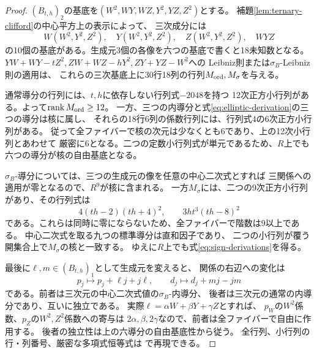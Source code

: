 \begin{proof}
$(B_{t,h})_2$の基底を$(W^2,WY,WZ,Y^2,YZ,Z^2)$とする。
補題\ref{lem:ternary-clifford}の中心平方上の表示によって、
三次成分には
\[
 W(W^2,Y^2,Z^2),\quad Y(W^2,Y^2,Z^2),\quad
 Z(W^2,Y^2,Z^2),\quad WYZ
\]
の10個の基底がある。生成元3個の各像を六つの基底で書くと18未知数となる。
$YW+WY-tZ^2,ZW+WZ-hY^2,ZY+YZ-W^2$への
Leibniz則または$\sigma_B$-Leibniz則の適用は、
これらの三次基底上に30行18列の行列$M_{\rm ord},M_\sigma$を与える。

通常導分の行列には、$t,h$に依存しない行列式$-2048$を持つ
12次正方小行列がある。よって$\operatorname{rank}M_{\rm ord}\ge12$。
一方、三つの内導分と式\eqref{eq:elliptic-derivation}の三つの導分は核に属し、
それらの18行6列の係数行列には、行列式$4$の6次正方小行列がある。
従って全ファイバーで核の次元は少なくとも6であり、上の12次小行列とあわせて
厳密に6となる。二つの定数小行列式が単元であるため、$R$上でも
六つの導分が核の自由基底となる。

$\sigma_B$-導分については、三つの生成元の像を任意の中心二次式とすれば
三関係への適用が零となるので、$R^9$が核に含まれる。
一方$M_\sigma$には、二つの9次正方小行列があり、その行列式は
\[
 4(th-2)(th+4)^2,\qquad 3ht^3(th-8)^2
\]
である。これらは同時に零にならないため、全ファイバーで階数は9以上である。
中心二次式を取る九つの標準導分は直和因子であり、
二つの小行列が覆う開集合上で$M_\sigma$の核と一致する。
ゆえに$R$上でも式\eqref{eq:sign-derivations}を得る。

最後に$\ell,m\in(B_{t,h})_1$として生成元を変えると、
関係の右辺への変化は
\[
 p_j\longmapsto p_j+\ell j+j\ell,\qquad
 d_j\longmapsto d_j+mj-jm
\]
である。前者は三次元の中心二次式値の$\sigma_B$-内導分、
後者は三次元の通常の内導分であり、互いに独立である。
実際$\ell=\alpha W+\beta Y+\gamma Z$とすれば、
$p_W$の$W^2$係数、$p_Z$の$W^2,Z^2$係数への寄与は
$2\alpha,\beta,2\gamma$なので、前者は全ファイバーで自由に作用する。
後者の独立性は上の六導分の自由基底性から従う。
全行列、小行列の行・列番号、厳密な多項式恒等式は
で再現できる。
\end{proof}


